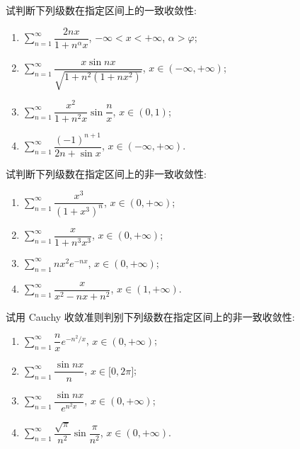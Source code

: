\documentclass[../数学分析培优讲义.tex]{subfiles}
\begin{document}
\begin{example}
试判断下列级数在指定区间上的一致收敛性:
\begin{enumerate}[label=(\arabic*)]
    \item $\displaystyle\sum\limits_{n=1}^{\infty}\dfrac{2nx}{1+n^\alpha x}$, $-\infty<x<+\infty$, $\alpha>\varphi$;
    \item $\displaystyle\sum\limits_{n=1}^{\infty}\dfrac{x\sin nx}{\sqrt{1+n^2(1+nx^2)}}$, $x\in(-\infty,+\infty)$;
    \item $\displaystyle\sum\limits_{n=1}^{\infty}\dfrac{x^2}{1+n^2x}\sin\dfrac{n}{x}$, $x\in(0,1)$;
    \item $\displaystyle\sum\limits_{n=1}^{\infty}\dfrac{(-1)^{n+1}}{2n+\sin x}$, $x\in(-\infty,+\infty)$.
\end{enumerate}
\end{example}
\exampleblank

\begin{example}
试判断下列级数在指定区间上的非一致收敛性:
\begin{enumerate}[label=(\arabic*)]
    \item $\displaystyle\sum\limits_{n=1}^{\infty}\dfrac{x^3}{(1+x^3)^n}$, $x\in(0,+\infty)$;
    \item $\displaystyle\sum\limits_{n=1}^{\infty}\dfrac{x}{1+n^3x^3}$, $x\in(0,+\infty)$;
    \item $\displaystyle\sum\limits_{n=1}^{\infty}nx^2e^{-nx}$, $x\in(0,+\infty)$;
    \item $\displaystyle\sum\limits_{n=1}^{\infty}\dfrac{x}{x^2-nx+n^2}$, $x\in(1,+\infty)$.
\end{enumerate}
\end{example}
\exampleblank

\begin{example}
试用 Cauchy 收敛准则判别下列级数在指定区间上的非一致收敛性:
\begin{enumerate}[label=(\arabic*)]
    \item $\displaystyle\sum\limits_{n=1}^{\infty}\dfrac{n}{x}e^{-n^2/x}$, $x\in(0,+\infty)$;
    \item $\displaystyle\sum\limits_{n=1}^{\infty}\dfrac{\sin nx}{n}$, $x\in\lbrack 0,2\pi\rbrack$;
    \item $\displaystyle\sum\limits_{n=1}^{\infty}\dfrac{\sin nx}{e^{n^2x}}$, $x\in(0,+\infty)$;
    \item $\displaystyle\sum\limits_{n=1}^{\infty}\dfrac{\sqrt{\pi}}{n^2}\sin\dfrac{\pi}{n^2}$, $x\in(0,+\infty)$.
\end{enumerate}
\end{example}
\exampleblank
\end{document}
